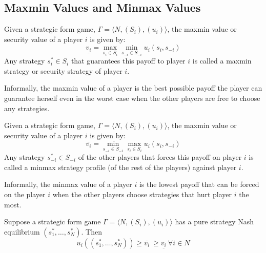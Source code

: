 {\subsection{Maxmin Values and Minmax Values}{\label{sbs:mvmv}}
\begin{defn}
	Given a strategic form game, $\Gamma = \langle N,(S_i),(u_i)\rangle$, the maxmin value or security value of a player $i$ is given by:
	\[\underline{v_i}=\max_{s_i\in S_i} \min_{s_{-i}\in S_{-i}} u_i(s_i,s_{-i})\]
	Any strategy $s_i^*\in S_i$ that guarantees this payoff to player $i$ is called a maxmin strategy or security strategy of player $i$.

	Informally, the maxmin value of a player is the best possible payoff the player can guarantee herself even in the worst case when the other players are free to choose any strategies.
\end{defn}
\begin{defn}
	Given a strategic form game, $\Gamma = \langle N,(S_i),(u_i)\rangle$, the maxmin value or security value of a player $i$ is given by:
	\[\overline{v_i}=\min_{s_{-i}\in S_{-i}} \max_{s_i\in S_i} u_i(s_i,s_{-i})\]
	Any strategy $s_{-i}^*\in S_{-i}$ of the other players that forces this payoff on player $i$ is called a minmax strategy profile (of the rest of the players) against player $i$.

	Informally, the minmax value of a player $i$ is the lowest payoff that can be forced on the player $i$ when the other players choose strategies that hurt player $i$ the most.
\end{defn}
\begin{prop}{\label{prop:mvmvrne}}
	Suppose a strategic form game  $\Gamma = \langle N,(S_i),(u_i)\rangle$ has a pure strategy Nash equilibrium $(s_1^*,\ldots,s_N^*)$.
	Then
	\[u_i((s_1^*,\ldots,s_N^*))\geq\overline{v_i}\ \geq\underline{v_i}\ \forall i\in N\]
\end{prop}
}
